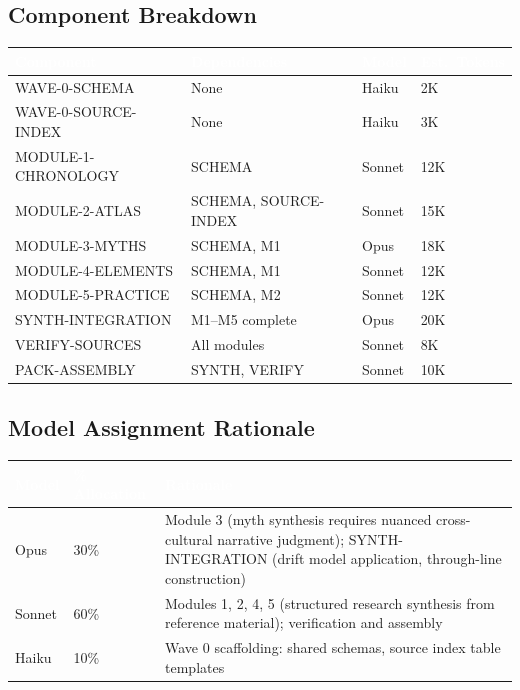 \documentclass[11pt,letterpaper]{article}
\newcommand{\tableheader}[1]{\textbf{\sffamily\textcolor{white}{#1}}}
\begin{document}
\subsection{Component Breakdown}

\begin{center}
\begin{tabularx}{\textwidth}{L{3.5cm}L{3cm}C{1.5cm}C{2cm}}
\toprule
{}
\tableheader{Component} & \tableheader{Dependencies} & \tableheader{Model} & \tableheader{Est.\ Tokens} \\
\midrule
WAVE-0-SCHEMA & None & Haiku & 2K \\
WAVE-0-SOURCE-INDEX & None & Haiku & 3K \\
MODULE-1-CHRONOLOGY & SCHEMA & Sonnet & 12K \\
MODULE-2-ATLAS & SCHEMA, SOURCE-INDEX & Sonnet & 15K \\
MODULE-3-MYTHS & SCHEMA, M1 & Opus & 18K \\
MODULE-4-ELEMENTS & SCHEMA, M1 & Sonnet & 12K \\
MODULE-5-PRACTICE & SCHEMA, M2 & Sonnet & 12K \\
SYNTH-INTEGRATION & M1--M5 complete & Opus & 20K \\
VERIFY-SOURCES & All modules & Sonnet & 8K \\
PACK-ASSEMBLY & SYNTH, VERIFY & Sonnet & 10K \\
\bottomrule
\end{tabularx}
\end{center}

\subsection{Model Assignment Rationale}

\begin{center}
\begin{tabularx}{\textwidth}{L{2cm}L{2.5cm}X}
\toprule
{}
\tableheader{Model} & \tableheader{\% Allocation} & \tableheader{Rationale} \\
\midrule
Opus & 30\% & Module 3 (myth synthesis requires nuanced cross-cultural narrative judgment); SYNTH-INTEGRATION (drift model application, through-line construction) \\
Sonnet & 60\% & Modules 1, 2, 4, 5 (structured research synthesis from reference material); verification and assembly \\
Haiku & 10\% & Wave 0 scaffolding: shared schemas, source index table templates \\
\bottomrule
\end{tabularx}
\end{center}
\end{document}

